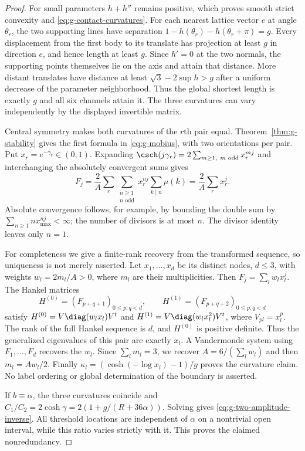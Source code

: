 \begin{proof}
For small parameters $h+h''$ remains positive, which proves smooth
strict convexity and \eqref{eq:g-contact-curvatures}. For each nearest
lattice vector $e$ at angle $\theta_r$, the two supporting lines have
separation $1-h(\theta_r)-h(\theta_r+\pi)=g$.
Every displacement from the first body to its translate has projection
at least $g$ in direction $e$, and hence length at least $g$.
Since $h'=0$ at the two normals, the supporting points themselves lie
on the axis and attain that distance. More distant translates have
distance at least $\sqrt3-2\sup h>g$ after a uniform decrease of the
parameter neighborhood. Thus the global shortest length is exactly
$g$ and all six channels attain it. The three curvatures can vary
independently by the displayed invertible matrix.

Central symmetry makes both curvatures of the $r$th pair equal.
Theorem~\ref{thm:g-stability} gives the first formula in
\eqref{eq:g-mobius}, with two orientations per pair. Put
$x_r=e^{-\gamma_r}\in(0,1)$. Expanding
$\csch(j\gamma_r)=2\sum_{m\ge1,\ m\text{ odd}}x_r^{mj}$
and interchanging the absolutely convergent sums gives
\[
 F_j=\frac2A\sum_r\sum_{\substack{n\ge1\\n\text{ odd}}}
        x_r^{nj}\sum_{k\mid n}\mu(k)=\frac2A\sum_r x_r^j.
\]
Absolute convergence follows, for example, by bounding the double sum
by $\sum_{n\ge1}n x_{\max}^{nj}<\infty$; the number of divisors
is at most $n$. The divisor identity leaves only $n=1$.

For completeness we give a finite-rank recovery from the transformed
sequence, so uniqueness is not merely asserted. Let $x_1,\ldots,x_d$
be its distinct nodes, $d\le3$, with weights $w_l=2m_l/A>0$, where
$m_l$ are their multiplicities. Then $F_j=\sum_l w_lx_l^j$.
The Hankel matrices
\[
 H^{(0)}=(F_{p+q+1})_{0\le p,q<d},\qquad
 H^{(1)}=(F_{p+q+2})_{0\le p,q<d}
\]
satisfy $H^{(0)}=V\diag(w_lx_l)V^t$ and
$H^{(1)}=V\diag(w_lx_l^2)V^t$, where $V_{pl}=x_l^p$.
The rank of the full Hankel sequence is $d$, and $H^{(0)}$ is positive
definite. Thus the generalized eigenvalues of this pair are exactly
$x_l$. A Vandermonde system using $F_1,\ldots,F_d$ recovers the $w_l$.
Since $\sum_lm_l=3$, we recover
$A=6/(\sum_lw_l)$ and then $m_l=Aw_l/2$.
Finally $\kappa_l=(\cosh(-\log x_l)-1)/g$ proves the curvature claim.
No label ordering or global determination of the boundary is asserted.

If $b\equiv\alpha$, the three curvatures coincide and
$C_1/C_2=2\cosh\gamma=2(1+g/(R+36\alpha))$.
Solving gives \eqref{eq:g-two-amplitude-inverse}. All threshold locations
are independent of $\alpha$ on a nontrivial open interval, while this
ratio varies strictly with it. This proves the claimed nonredundancy.
\end{proof}

